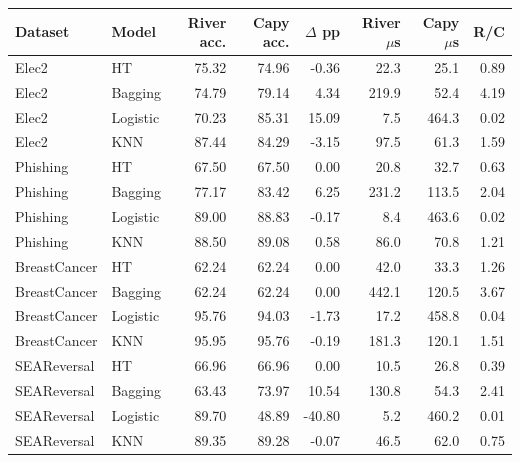 \begin{tabular}{llrrrrrr}
\toprule
Dataset & Model & River acc. & Capy acc. & $\Delta$ pp & River $\mu$s & Capy $\mu$s & R/C \\
\midrule
Elec2 & HT & 75.32 & 74.96 & -0.36 & 22.3 & 25.1 & 0.89 \\
Elec2 & Bagging & 74.79 & 79.14 & 4.34 & 219.9 & 52.4 & 4.19 \\
Elec2 & Logistic & 70.23 & 85.31 & 15.09 & 7.5 & 464.3 & 0.02 \\
Elec2 & KNN & 87.44 & 84.29 & -3.15 & 97.5 & 61.3 & 1.59 \\
Phishing & HT & 67.50 & 67.50 & 0.00 & 20.8 & 32.7 & 0.63 \\
Phishing & Bagging & 77.17 & 83.42 & 6.25 & 231.2 & 113.5 & 2.04 \\
Phishing & Logistic & 89.00 & 88.83 & -0.17 & 8.4 & 463.6 & 0.02 \\
Phishing & KNN & 88.50 & 89.08 & 0.58 & 86.0 & 70.8 & 1.21 \\
BreastCancer & HT & 62.24 & 62.24 & 0.00 & 42.0 & 33.3 & 1.26 \\
BreastCancer & Bagging & 62.24 & 62.24 & 0.00 & 442.1 & 120.5 & 3.67 \\
BreastCancer & Logistic & 95.76 & 94.03 & -1.73 & 17.2 & 458.8 & 0.04 \\
BreastCancer & KNN & 95.95 & 95.76 & -0.19 & 181.3 & 120.1 & 1.51 \\
SEAReversal & HT & 66.96 & 66.96 & 0.00 & 10.5 & 26.8 & 0.39 \\
SEAReversal & Bagging & 63.43 & 73.97 & 10.54 & 130.8 & 54.3 & 2.41 \\
SEAReversal & Logistic & 89.70 & 48.89 & -40.80 & 5.2 & 460.2 & 0.01 \\
SEAReversal & KNN & 89.35 & 89.28 & -0.07 & 46.5 & 62.0 & 0.75 \\
\bottomrule
\end{tabular}
